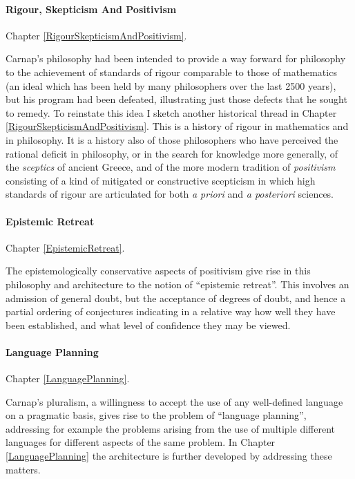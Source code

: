\paragraph{Rigour, Skepticism And Positivism}

Chapter \ref{RigourSkepticismAndPositivism}.

Carnap's philosophy had been intended to provide a way forward for
philosophy to the achievement of standards of rigour comparable to
those of mathematics (an ideal which has been held by many
philosophers over the last 2500 years), but his program had been
defeated, illustrating  just those defects that he sought to remedy.
To reinstate this idea I sketch another historical thread in Chapter \ref{RigourSkepticismAndPositivism}.
This is a history of rigour in mathematics and in philosophy.
It is a history also of those philosophers who have perceived the
rational deficit in philosophy, or in the search for knowledge more
generally, of the {\it sceptics} of ancient Greece, and of the more
modern tradition of {\it positivism} consisting of a kind of
mitigated or constructive scepticism in which high standards of rigour
are articulated for both {\it a priori} and {\it a posteriori} sciences.

\paragraph{Epistemic Retreat}

Chapter \ref{EpistemicRetreat}.

The epistemologically conservative aspects of positivism give rise in
this philosophy and architecture to the notion of ``epistemic
retreat''.
This involves an admission of general doubt, but the acceptance of
degrees of doubt, and hence a partial ordering of conjectures
indicating in a relative way how well they have been established, and
what level of confidence they may be viewed.

\paragraph{Language Planning}

Chapter \ref{LanguagePlanning}.

Carnap's pluralism, a willingness to accept the use of any
well-defined language on a pragmatic basis, gives rise to the problem
of ``language planning'', addressing for example the problems arising
from the use of multiple different languages for different aspects of
the same problem.
In Chapter \ref{LanguagePlanning} the architecture is further
developed by addressing these matters.

